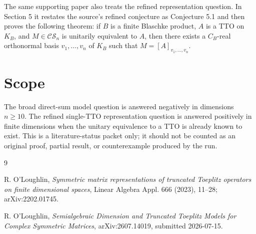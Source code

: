 \documentclass[11pt]{article}
\begin{document}
The same supporting paper also treats the refined representation question. In
Section 5 it restates the source's refined conjecture as Conjecture 5.1 and then
proves the following theorem: if \(B\) is a finite Blaschke product, \(A\) is a
TTO on \(K_B\), and \(M\in\mathcal{CS}_n\) is unitarily equivalent to \(A\), then
there exists a \(C_B\)-real orthonormal basis \(v_1,\ldots,v_n\) of \(K_B\) such
that \(M=[A]_{v_1,\ldots,v_n}\).

\section*{Scope}

The broad direct-sum model question is answered negatively in dimensions
\(n\geq 10\). The refined single-TTO representation question is answered
positively in finite dimensions when the unitary equivalence to a TTO is already
known to exist. This is a literature-status packet only; it should not be counted
as an original proof, partial result, or counterexample produced by the run.

\begin{thebibliography}{9}

R. O'Loughlin,
\emph{Symmetric matrix representations of truncated Toeplitz operators on finite
dimensional spaces},
Linear Algebra Appl. 666 (2023), 11--28; arXiv:2202.01745.

R. O'Loughlin,
\emph{Semialgebraic Dimension and Truncated Toeplitz Models for Complex
Symmetric Matrices},
arXiv:2607.14019, submitted 2026-07-15.

\end{thebibliography}
\end{document}
